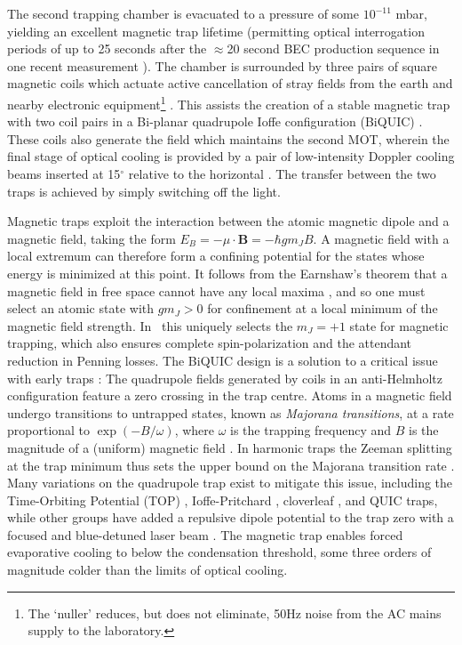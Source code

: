 	The second trapping chamber is evacuated to a pressure of some $10^{-11}$ mbar, yielding an excellent magnetic trap lifetime (permitting optical interrogation periods of up to 25 seconds after the $\approx$20 second BEC production sequence in one recent measurement \cite{Thomas20}).
	The chamber is surrounded by three pairs of square magnetic coils which actuate active cancellation of stray fields from the earth and nearby electronic equipment\footnote{The `nuller' reduces, but does not eliminate, 50Hz noise from the AC mains supply to the laboratory.} \cite{Dedman07}.
	This assists the creation of a stable magnetic trap with two coil pairs in a Bi-planar quadrupole Ioffe configuration (BiQUIC) \cite{Dall07}.
	These coils also generate the field which maintains the second MOT, wherein the final stage of optical cooling is provided by a pair of low-intensity Doppler cooling beams inserted at 15$^\circ$ relative to the horizontal \cite{Dall07_BEC}.
	The transfer between the two traps is achieved by simply switching off the light.


	Magnetic traps exploit the interaction between the atomic magnetic dipole and a magnetic field, taking the form $E_B = -\mu\cdot \textbf{B} = -\hbar g m_J B$.
	A magnetic field with a local extremum can therefore form a confining potential for the states whose energy is minimized at this point.
	It follows from the Earnshaw's theorem that a magnetic field in free space cannot have any local maxima \cite{Harms00,MakingProbingUnderstanding}, and so one must select an atomic state with $g m_J>0$ for confinement at a local minimum of the magnetic field strength.
	In \mhe~this uniquely selects the $m_J=+1$ state for magnetic trapping, which also ensures complete spin-polarization and the attendant reduction in Penning losses.
	The BiQUIC design is a solution to a critical issue with early traps \cite{Migdall85}: The quadrupole fields generated by coils in an anti-Helmholtz configuration feature a zero crossing in the trap centre.
	Atoms in a magnetic field undergo transitions to untrapped states, known as \emph{Majorana transitions}, at a rate proportional to $\exp(-B/\omega)$, where $\omega$ is the trapping frequency and $B$ is the magnitude of a (uniform) magnetic field \cite{Sukumar97}.
	In harmonic traps the Zeeman splitting at the trap minimum thus sets the upper bound on the Majorana transition rate \cite{Brink06}.
	Many variations on the quadrupole trap exist to mitigate this issue, including the Time-Orbiting Potential (TOP) \cite{Petrich95}, Ioffe-Pritchard \cite{Pritchard83}, cloverleaf \cite{Mewes96}, and QUIC \cite{Esslinger98} traps, while other groups have added a repulsive dipole potential to the trap zero with a focused and blue-detuned laser beam \cite{Davis95}.
	The magnetic trap enables forced evaporative cooling to below the condensation threshold, some three orders of magnitude colder than the limits of optical cooling. 


